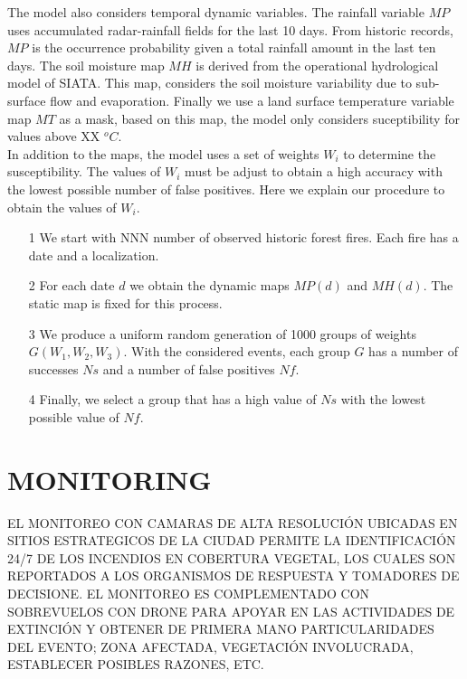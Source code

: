 The model also considers temporal dynamic variables.  The rainfall variable $MP$ uses accumulated radar-rainfall fields for the last 10 days. From historic records, $MP$ is the occurrence probability given a total rainfall amount in the last ten days. The soil moisture map $MH$ is derived from the operational hydrological model of SIATA. This map, considers the soil moisture variability due to sub-surface flow and evaporation. Finally we use a land surface temperature variable map $MT$ as a mask, based on this map, the model only considers suceptibility for values above XX $^oC$.\\

In addition to the maps, the model uses a set of weights $W_i$ to determine the susceptibility. The values of $W_i$ must be adjust to obtain a high accuracy with the lowest possible number of false positives. Here we explain our procedure to obtain the values of $W_i$.\\
 
 \begin{itemize}
     \item[1] We start with NNN number of observed historic forest fires.  Each fire has a date and a localization.  
     
     \item[2] For each date $d$ we obtain the dynamic maps $MP(d)$ and $MH(d)$.  The static map is fixed for this process.  
     
     \item[3] We produce a uniform random generation of 1000 groups of weights $G(W_1, W_2, W_3)$. With the considered events, each group $G$ has a number of successes $Ns$ and a number of false positives $Nf$.
     
     \item[4] Finally, we select a group that has a high value of $Ns$ with the lowest possible value of $Nf$.
 \end{itemize}



\section*{MONITORING}

EL MONITOREO CON CAMARAS DE ALTA RESOLUCIÓN UBICADAS EN SITIOS ESTRATEGICOS DE LA CIUDAD PERMITE LA IDENTIFICACIÓN 24/7 DE LOS INCENDIOS EN COBERTURA VEGETAL, LOS CUALES SON REPORTADOS A LOS ORGANISMOS DE RESPUESTA Y TOMADORES DE DECISIONE. EL MONITOREO ES COMPLEMENTADO CON SOBREVUELOS CON DRONE PARA APOYAR EN LAS ACTIVIDADES DE EXTINCIÓN Y OBTENER DE PRIMERA MANO PARTICULARIDADES DEL EVENTO; ZONA AFECTADA, VEGETACIÓN INVOLUCRADA, ESTABLECER POSIBLES RAZONES, ETC.\\

